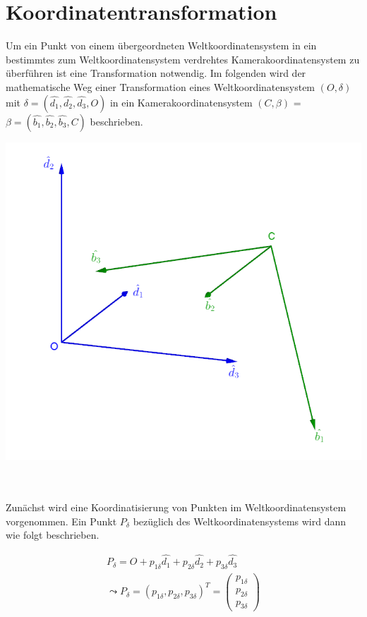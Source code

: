 \section{Koordinatentransformation}

Um ein Punkt von einem übergeordneten Weltkoordinatensystem in ein bestimmtes zum Weltkoordinatensystem verdrehtes Kamerakoordinatensystem zu überführen ist eine Transformation notwendig. Im folgenden wird der mathematische Weg einer Transformation eines Weltkoordinatensystem $(O,\delta)$ mit $\delta = (\hat{d_1},\hat{d_2},\hat{d_3},O)$ in ein Kamerakoordinatensystem $(C,\beta)$ = $\beta = (\hat{b_1},\hat{b_2},\hat{b_3},C)$ beschrieben.



\begin{minipage}{\linewidth}
	\centering
	\includegraphics[width=0.7\linewidth]{images/WeltKordSys.png}
	\label{fig:Koordinatensysteme1}
\end{minipage}\\ \\

Zunächst wird eine Koordinatisierung von Punkten im Weltkoordinatensystem vorgenommen. Ein Punkt $P_\delta$ bezüglich des Weltkoordinatensystems wird dann wie folgt beschrieben.


\begin{gather}
	P_\delta = O + p_{1\delta}\hat{d_1} + p_{2\delta}\hat{d_2} + p_{3\delta}\hat{d_3}\\
	\leadsto P_\delta = (p_{1\delta},p_{2\delta},p_{3\delta})^T = \begin{pmatrix} p_{1\delta} \\ p_{2\delta} \\ p_{3\delta} \end{pmatrix}
\end{gather}

